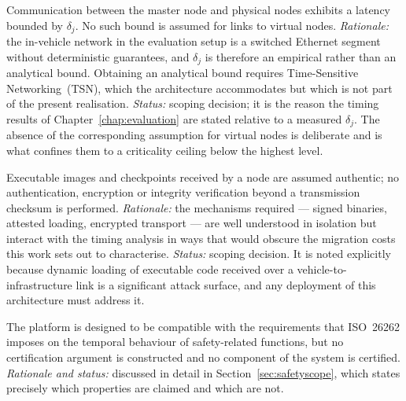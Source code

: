 \begin{description}
	Communication between the master node and physical nodes exhibits a
	latency bounded by $\delta_j$. No such bound is assumed for links to
	virtual nodes.
	\emph{Rationale:} the in-vehicle network in the evaluation setup is a
	switched Ethernet segment without deterministic guarantees, and $\delta_j$
	is therefore an empirical rather than an analytical bound. Obtaining an
	analytical bound requires Time-Sensitive Networking~(TSN), which the
	architecture accommodates but which is not part of the present
	realisation.
	\emph{Status:} scoping decision; it is the reason the timing results of
	Chapter~\ref{chap:evaluation} are stated relative to a measured
	$\delta_j$. The absence of the corresponding assumption for virtual nodes
	is deliberate and is what confines them to a criticality ceiling below
	the highest level.
	
	Executable images and checkpoints received by a node are assumed
	authentic; no authentication, encryption or integrity verification beyond
	a transmission checksum is performed.
	\emph{Rationale:} the mechanisms required --- signed binaries, attested
	loading, encrypted transport --- are well understood in isolation but
	interact with the timing analysis in ways that would obscure the
	migration costs this work sets out to characterise.
	\emph{Status:} scoping decision. It is noted explicitly because dynamic
	loading of executable code received over a vehicle-to-infrastructure link
	is a significant attack surface, and any deployment of this architecture
	must address it.
	
	The platform is designed to be compatible with the requirements that
	ISO~26262 imposes on the temporal behaviour of safety-related functions,
	but no certification argument is constructed and no component of the
	system is certified.
	\emph{Rationale and status:} discussed in detail in
	Section~\ref{sec:safetyscope}, which states precisely which properties
	are claimed and which are not.
	
\end{description}



